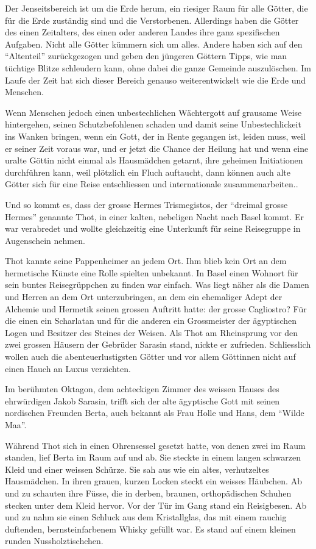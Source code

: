 \documentclass[11pt,titlepage,a5paper]{book}
\begin{document}
Der Jenseitsbereich ist um die Erde herum, ein riesiger Raum für alle Götter, die für die Erde zuständig sind und die Verstorbenen. Allerdings haben die Götter des einen Zeitalters, des einen oder anderen Landes ihre ganz spezifischen Aufgaben. Nicht alle Götter kümmern sich um alles. Andere haben sich auf den "`Altenteil"' zurückgezogen und geben den jüngeren Göttern Tipps, wie man tüchtige Blitze schleudern kann, ohne dabei die ganze Gemeinde auszulöschen. Im Laufe der Zeit hat sich dieser Bereich genauso weiterentwickelt wie die Erde und Menschen.

Wenn Menschen jedoch einen unbestechlichen Wächtergott auf grausame Weise hintergehen, seinen Schutzbefohlenen schaden und damit seine Unbestechlickeit ins Wanken bringen, wenn ein Gott, der in Rente gegangen ist, leiden muss, weil er seiner Zeit voraus war, und er jetzt die Chance der Heilung hat und wenn eine uralte Göttin nicht einmal als Hausmädchen getarnt, ihre geheimen Initiationen durchführen kann, weil plötzlich ein Fluch auftaucht, dann können auch alte Götter sich für eine Reise entschliessen und internationale zusammenarbeiten..

Und so kommt es, dass der grosse Hermes Trismegistos, der "`dreimal grosse Hermes"' genannte Thot, in einer kalten, nebeligen Nacht nach Basel kommt. Er war verabredet und wollte gleichzeitig eine Unterkunft für seine Reisegruppe in Augenschein nehmen.

Thot kannte seine Pappenheimer an jedem Ort. Ihm blieb kein Ort an dem hermetische Künste eine Rolle spielten unbekannt. In Basel einen Wohnort für sein buntes Reisegrüppchen zu finden war einfach. Was liegt näher als die Damen und Herren an dem Ort unterzubringen, an dem ein ehemaliger Adept der Alchemie und Hermetik seinen grossen Auftritt hatte: der grosse Cagliostro? Für die einen ein Scharlatan und für die anderen ein Grossmeister der ägyptischen Logen und Besitzer des Steines der Weisen. Als Thot am Rheinsprung vor den zwei grossen Häusern der Gebrüder Sarasin stand, nickte er zufrieden. Schliesslich wollen auch die abenteuerlustigsten Götter und vor allem Göttinnen nicht auf einen Hauch an Luxus verzichten.

Im berühmten Oktagon, dem achteckigen Zimmer des weissen Hauses des ehrwürdigen Jakob Sarasin, trifft sich der alte ägyptische Gott mit seinen nordischen Freunden Berta, auch bekannt als Frau Holle und Hans, dem "`Wilde Maa"'.

Während Thot sich in einen Ohrensessel gesetzt hatte, von denen zwei im Raum standen, lief Berta im Raum auf und ab. Sie steckte in einem langen schwarzen Kleid und einer weissen Schürze. Sie sah aus wie ein altes, verhutzeltes Hausmädchen. In ihren grauen, kurzen Locken steckt ein weisses Häubchen. Ab und zu schauten ihre Füsse, die in derben, braunen, orthopädischen Schuhen stecken unter dem Kleid hervor. Vor der Tür im Gang stand ein Reisigbesen. Ab und zu nahm sie einen Schluck aus dem Kristallglas, das mit einem rauchig duftenden, bernsteinfarbenem Whisky gefüllt war. Es stand auf einem kleinen runden Nussholztischchen.
\end{document}
